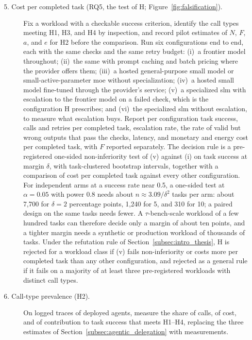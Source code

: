 \begin{description}
  \item[5. Cost per completed task (RQ5, the test of H; Figure~\ref{fig:falsification}).] Fix a workload with a checkable success criterion, identify the call types meeting H1, H3, and H4 by inspection, and record pilot estimates of $N$, $F$, $a$, and $e$ for H2 before the comparison. Run six configurations end to end, each with the same checks and the same retry budget: (i)~a frontier model throughout; (ii)~the same with prompt caching and batch pricing where the provider offers them; (iii)~a hosted general-purpose small model or small-active-parameter \gls{moe} without specialization; (iv)~a hosted small model fine-tuned through the provider's service; (v)~a specialized \gls{slm} with escalation to the frontier model on a failed check, which is the configuration H prescribes; and (vi)~the specialized \gls{slm} without escalation, to measure what escalation buys. Report per configuration task success, calls and retries per completed task, escalation rate, the rate of valid but wrong outputs that pass the checks, latency, and monetary and energy cost per completed task, with $F$ reported separately. The decision rule is a pre-registered one-sided non-inferiority test of (v) against (i) on task success at margin $\delta$, with task-clustered bootstrap intervals, together with a comparison of cost per completed task against every other configuration. For independent arms at a success rate near 0.5, a one-sided test at $\alpha = 0.05$ with power 0.8 needs about $n \approx 3.09/\delta^2$ tasks per arm: about 7{,}700 for $\delta = 2$ percentage points, 1{,}240 for 5, and 310 for 10; a paired design on the same tasks needs fewer. A $\tau$-bench-scale workload of a few hundred tasks can therefore decide only a margin of about ten points, and a tighter margin needs a synthetic or production workload of thousands of tasks. Under the refutation rule of Section~\ref{subsec:intro_thesis}, H is rejected for a workload class if (v) fails non-inferiority or costs more per completed task than any other configuration, and rejected as a general rule if it fails on a majority of at least three pre-registered workloads with distinct call types.
  \item[6. Call-type prevalence (H2).] On logged traces of deployed agents, measure the share of calls, of cost, and of contribution to task success that meets H1--H4, replacing the three estimates of Section~\ref{subsec:agentic_delegation} with measurements.
\end{description}

